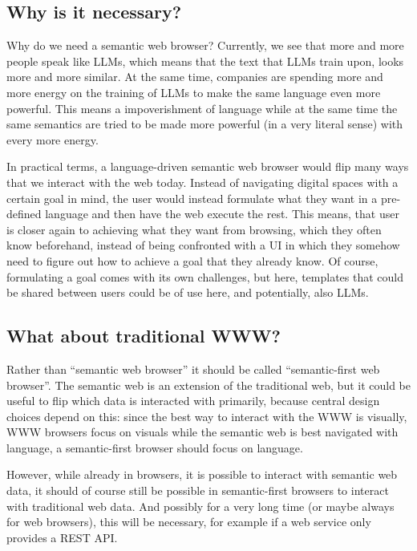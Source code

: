 \documentclass[12pt,a4paper]{article}
\begin{document}
\subsection{Why is it necessary?}

Why do we need a semantic web browser? Currently, we see that more and more people speak like LLMs, which means that the text that LLMs train upon, looks more and more similar. At the same time, companies are spending more and more energy on the training of LLMs to make the same language even more powerful. This means a impoverishment of language while at the same time the same semantics are tried to be made more powerful (in a very literal sense) with every more energy.

In practical terms, a language-driven semantic web browser would flip many ways that we interact with the web today. Instead of navigating digital spaces with a certain goal in mind, the user would instead formulate what they want in a pre-defined language and then have the web execute the rest. This means, that user is closer again to achieving what they want from browsing, which they often know beforehand, instead of being confronted with a UI in which they somehow need to figure out how to achieve a goal that they already know. Of course, formulating a goal comes with its own challenges, but here, templates that could be shared between users could be of use here, and potentially, also LLMs.

\subsection{What about traditional WWW?}

Rather than ``semantic web browser'' it should be called ``semantic-first web browser''. The semantic web is an extension of the traditional web, but it could be useful to flip which data is interacted with primarily, because central design choices depend on this: since the best way to interact with the WWW is visually, WWW browsers focus on visuals while the semantic web is best navigated with language, a semantic-first browser should focus on language.

However, while already in browsers, it is possible to interact with semantic web data, it should of course still be possible in semantic-first browsers to interact with traditional web data. And possibly for a very long time (or maybe always for web browsers), this will be necessary, for example if a web service only provides a REST API.
\end{document}
